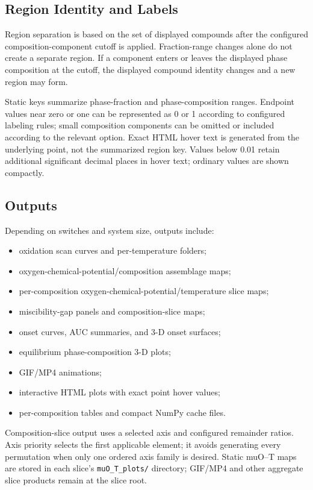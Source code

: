 \documentclass[11pt,letterpaper]{article}
\newcommand{\file}[1]{\nolinkurl{#1}}
\begin{document}
\subsection{Region Identity and Labels}

Region separation is based on the set of displayed compounds after the
configured composition-component cutoff is applied. Fraction-range changes
alone do not create a separate region. If a component enters or leaves the
displayed phase composition at the cutoff, the displayed compound identity
changes and a new region may form.

Static keys summarize phase-fraction and phase-composition ranges. Endpoint
values near zero or one can be represented as 0 or 1 according to configured
labeling rules; small composition components can be omitted or included
according to the relevant option. Exact HTML hover text is generated from the
underlying point, not the summarized region key. Values below 0.01 retain
additional significant decimal places in hover text; ordinary values are
shown compactly.

\subsection{Outputs}

Depending on switches and system size, outputs include:
\begin{itemize}
  \item oxidation scan curves and per-temperature folders;
  \item oxygen-chemical-potential/composition assemblage maps;
  \item per-composition oxygen-chemical-potential/temperature slice maps;
  \item miscibility-gap panels and composition-slice maps;
  \item onset curves, AUC summaries, and 3-D onset surfaces;
  \item equilibrium phase-composition 3-D plots;
  \item GIF/MP4 animations;
  \item interactive HTML plots with exact point hover values;
  \item per-composition tables and compact NumPy cache files.
\end{itemize}

Composition-slice output uses a selected axis and configured remainder ratios.
Axis priority selects the first applicable element; it avoids generating every
permutation when only one ordered axis family is desired. Static muO--T maps
are stored in each slice's \file{muO_T_plots/} directory; GIF/MP4 and other
aggregate slice products remain at the slice root.
\end{document}
